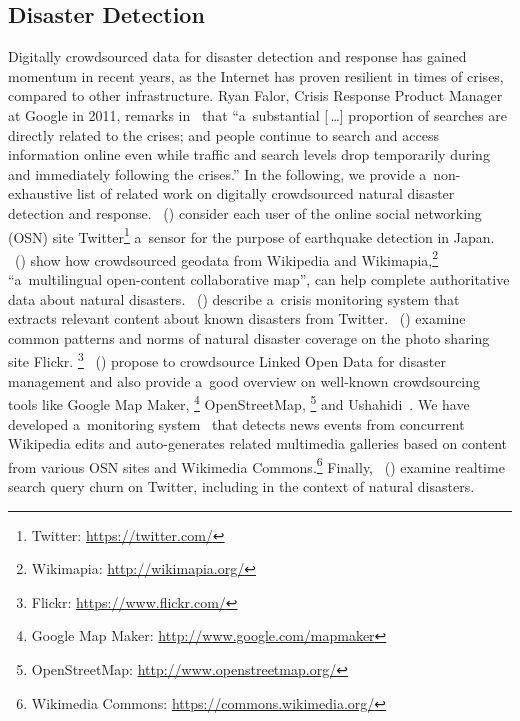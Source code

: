 \documentclass[letterpaper]{article}
\newcommand\citet[1]{\citeauthor{#1}~(\citeyear{#1})}
\begin{document}
\subsection{Disaster Detection}
Digitally crowdsourced data for disaster detection and response
has gained momentum in recent years,
as the Internet has proven resilient in times of crises,
compared to other infrastructure.
Ryan Falor, Crisis Response Product Manager at Google in 2011,
remarks in~\cite{falor2011googleorg} that
``a~substantial \textup{[\,\dots]} proportion of searches
are directly related to the crises;
and people continue to search and access information online
even while traffic and search levels drop temporarily
during and immediately following the crises.''
In the following, we provide a~non-exhaustive list of related work
on digitally crowdsourced natural disaster detection and response.
\citet{sakaki2010earthquake} consider each user
of the online social networking (OSN) site
Twitter\footnote{Twitter: \url{https://twitter.com/}} a~sensor
for the purpose of earthquake detection in Japan.
\citet{goodchild2010crowdsourcing} show
how crowdsourced geodata from Wikipedia and
Wikimapia,\footnote{Wikimapia: \url{http://wikimapia.org/}}
``a~multilingual open-content collaborative map'',
can help complete authoritative data about natural disasters.
\citet{abel2012twitcident} describe
a~crisis monitoring system that extracts relevant content
about known disasters from Twitter.
\citet{liu2008search} examine
common patterns and norms of natural disaster coverage
on the photo sharing site Flickr.%
\footnote{Flickr: \url{https://www.flickr.com/}}
\citet{ortmann2011disaster} propose
to crowdsource Linked Open Data for disaster management
and also provide a~good overview on well-known crowdsourcing tools
like  Google Map Maker,%
\footnote{Google Map Maker:
\url{http://www.google.com/mapmaker}}
OpenStreetMap,%
\footnote{OpenStreetMap: \url{http://www.openstreetmap.org/}}
and Ushahidi~\cite{okolloh2009ushahidi}.
We have developed a~monitoring system~\cite{steiner2014thesis}
that detects news events from concurrent Wikipedia edits
and auto-generates related multimedia galleries
based on content from various OSN sites
and Wikimedia Commons.\footnote{Wikimedia Commons: \url{https://commons.wikimedia.org/}}
Finally, \citet{lin2012churn} examine realtime search query churn on Twitter,
including in the context of natural disasters.
\end{document}
